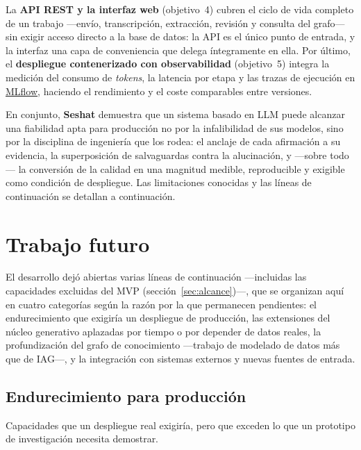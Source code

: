 La \textbf{API REST y la interfaz web} (objetivo~4) cubren el ciclo de vida completo de un trabajo
—envío, transcripción, extracción, revisión y consulta del grafo— sin exigir acceso directo a la
base de datos: la \ac{API} es el único punto de entrada, y la interfaz una capa de conveniencia que
delega íntegramente en ella. Por último, el \textbf{despliegue contenerizado con observabilidad}
(objetivo~5) integra la medición del consumo de \textit{tokens}, la latencia por etapa y las trazas
de ejecución en \href{https://mlflow.org}{MLflow}, haciendo el rendimiento y el coste comparables
entre versiones.

En conjunto, \textbf{Seshat} demuestra que un sistema basado en \ac{LLM} puede alcanzar una fiabilidad
apta para producción no por la infalibilidad de sus modelos, sino por la disciplina de ingeniería
que los rodea: el anclaje de cada afirmación a su evidencia, la superposición de salvaguardas contra
la alucinación, y —sobre todo— la conversión de la calidad en una magnitud medible, reproducible y
exigible como condición de despliegue. Las limitaciones conocidas y las líneas de continuación se
detallan a continuación.

\section{Trabajo futuro}
\label{sec:trabajo-futuro}

El desarrollo dejó abiertas varias líneas de continuación —incluidas las capacidades excluidas del
\ac{MVP} (sección~\ref{sec:alcance})—, que se organizan aquí en cuatro categorías según la razón por
la que permanecen pendientes: el endurecimiento que exigiría un despliegue de producción, las
extensiones del núcleo generativo aplazadas por tiempo o por depender de datos reales, la
profundización del grafo de conocimiento —trabajo de modelado de datos más que de \ac{IAG}—, y la
integración con sistemas externos y nuevas fuentes de entrada.

\subsection{Endurecimiento para producción}

Capacidades que un despliegue real exigiría, pero que exceden lo que un prototipo de investigación
necesita demostrar.

